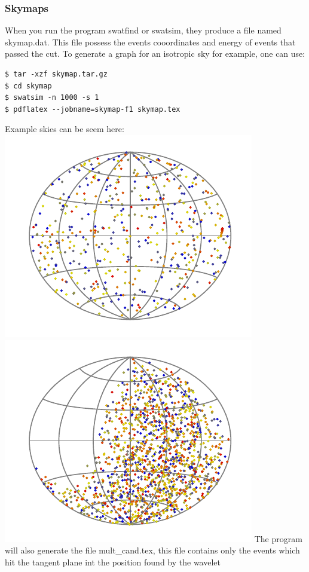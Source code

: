\documentclass[12pt]{article}
\begin{document}
\subsubsection{Skymaps}
When you run the program swatfind or swatsim, they produce a file named
skymap.dat. This file possess the events cooordinates and energy of events that
passed the cut. To generate a graph for an isotropic sky for example, one can
use:
{\bf \color{brown}
\begin{lstlisting}
$ tar -xzf skymap.tar.gz
$ cd skymap
$ swatsim -n 1000 -s 1
$ pdflatex --jobname=skymap-f1 skymap.tex
\end{lstlisting}
}
Example skies can be seem here:\\
\includegraphics[scale=1.0]{skymap-sim.pdf} 
\includegraphics[scale=1.0]{skymap.pdf}
The program will also generate the file mult\_cand.tex, this file contains only
the events which hit the tangent plane int the position found by the wavelet
\end{document}
